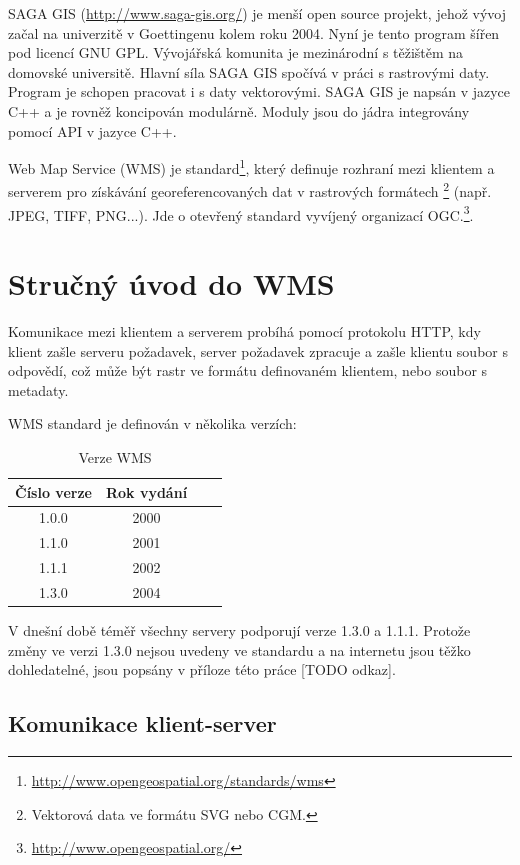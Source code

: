 \documentclass[a4paper,12pt]{article}
\begin{document}
SAGA GIS (\url{http://www.saga-gis.org/}) je menší open source
projekt, jehož vývoj začal na univerzitě v Goettingenu kolem roku
2004. Nyní je tento program šířen pod licencí GNU GPL. Vývojářská
komunita je mezinárodní s těžištěm na domovské universitě. Hlavní síla
SAGA GIS spočívá v práci s rastrovými daty. Program je schopen
pracovat i s daty vektorovými.  SAGA GIS je napsán v jazyce C++ a je
rovněž koncipován modulárně. Moduly jsou do jádra integrovány pomocí
API v jazyce C++.

Web Map Service (WMS) je
standard\footnote{\url{http://www.opengeospatial.org/standards/wms}},
který definuje rozhraní mezi klientem a serverem pro získávání
georeferencovaných dat v rastrových formátech \footnote{ Vektorová
  data ve formátu SVG nebo CGM.} (např. JPEG, TIFF, PNG...).  Jde o
otevřený standard vyvíjený organizací
OGC.\footnote{\url{http://www.opengeospatial.org/}}.

\newpage
\section{Stručný úvod do WMS}

Komunikace mezi klientem a serverem probíhá pomocí protokolu HTTP, kdy
klient zašle serveru požadavek, server požadavek zpracuje a zašle
klientu soubor s odpovědí, což může být rastr ve formátu definovaném
klientem, nebo soubor s metadaty.

WMS standard je definován v několika verzích:

\begin{table}[h]
\centering
\begin{tabular}{|c|c|c|c|}      \hline
  Číslo verze  & Rok vydání  \\ \hline
  1.0.0        &  2000       \\ \hline
  1.1.0        &  2001       \\ \hline
  1.1.1        &  2002       \\ \hline
  1.3.0        &  2004       \\ \hline
\end{tabular}
\caption{Verze WMS}
\label{tab:verze}
\end{table}

V dnešní době téměř všechny servery podporují verze 1.3.0 a
1.1.1. Protože změny ve verzi 1.3.0 nejsou uvedeny ve standardu a na
internetu jsou těžko dohledatelné, jsou popsány v příloze této práce
[TODO odkaz].

\subsection{Komunikace klient-server}
\end{document}
